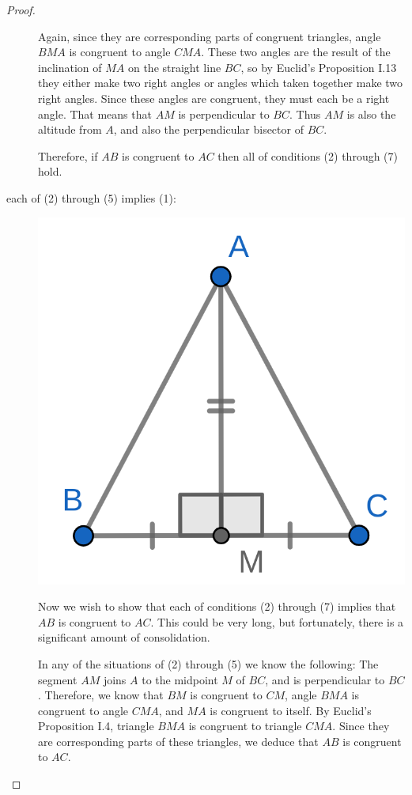 \documentclass{tufte-handout}
\theoremstyle{definition}
\begin{document}
\begin{proof}
\begin{description}
Again, since they are corresponding parts of congruent triangles, angle $BMA$ is congruent to angle $CMA$. These two angles are the result of the inclination of $MA$ on the straight line $BC$, so by Euclid's Proposition I.13 they either make two right angles or angles which taken together make two right angles. Since these angles are congruent, they must each be a right angle. That means that $AM$ is perpendicular to $BC$. Thus $AM$ is also the altitude from $A$, and also the perpendicular bisector of $BC$.

Therefore, if $AB$ is congruent to $AC$ then all of conditions (2) through (7) hold.


\item[each of (2) through (5) implies (1):]
\begin{marginfigure}
  \includegraphics{images/iso_2.png}
\end{marginfigure}
Now we wish to show that each of conditions (2) through (7) implies that $AB$ is congruent to $AC$. This could be very long, but fortunately, there is a significant amount of consolidation.



In any of the situations of (2) through (5) we know the following: The segment $AM$ joins $A$ to the midpoint $M$ of $BC$, and is perpendicular to $BC$. Therefore, we know that $BM$ is congruent to $CM$, angle $BMA$ is congruent to angle $CMA$, and $MA$ is congruent to itself. By Euclid's Proposition I.4, triangle $BMA$ is congruent to triangle $CMA$. Since they are corresponding parts of these triangles, we deduce that $AB$ is congruent to $AC$.



\end{description}
\end{proof}
\end{document}
